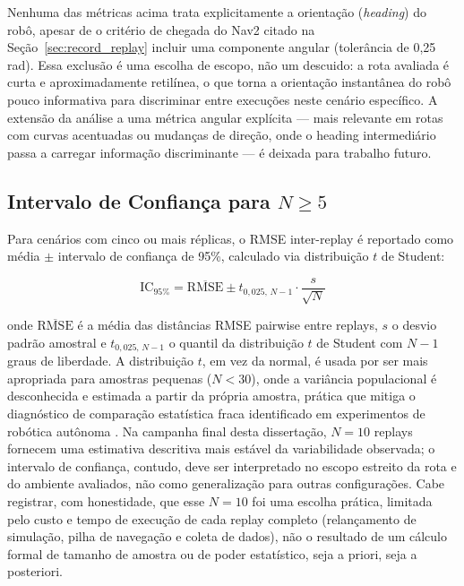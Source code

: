 Nenhuma das métricas acima trata explicitamente a orientação (\textit{heading})
do robô, apesar de o critério de chegada do Nav2 citado na
Seção~\ref{sec:record_replay} incluir uma componente angular (tolerância de
0,25\,rad). Essa exclusão é uma escolha de escopo, não um descuido: a rota
avaliada é curta e aproximadamente retilínea, o que torna a orientação
instantânea do robô pouco informativa para discriminar entre execuções neste
cenário específico. A extensão da análise a uma métrica angular explícita ---
mais relevante em rotas com curvas acentuadas ou mudanças de direção, onde o
heading intermediário passa a carregar informação discriminante --- é deixada
para trabalho futuro.

\subsection{Intervalo de Confiança para $N \geq 5$}
\label{sec:ic_estatistico}

Para cenários com cinco ou mais réplicas, o RMSE inter-replay é reportado como
média $\pm$ intervalo de confiança de 95\%, calculado via distribuição $t$ de
Student:

\begin{equation}
\text{IC}_{95\%} = \overline{\text{RMSE}} \pm t_{0{,}025,\, N-1} \cdot \frac{s}{\sqrt{N}}
\label{eq:ic_95}
\end{equation}

\noindent onde $\overline{\text{RMSE}}$ é a média das distâncias RMSE pairwise entre
replays, $s$ o desvio padrão amostral e $t_{0{,}025,\,N-1}$ o quantil da
distribuição $t$ de Student com $N-1$ graus de liberdade. A distribuição $t$,
em vez da normal, é usada por ser mais apropriada para amostras pequenas
($N < 30$), onde a variância populacional é desconhecida e estimada a partir
da própria amostra, prática que mitiga o diagnóstico de comparação
estatística fraca identificado em experimentos de robótica autônoma
\cite{amigoni2014}. Na campanha final desta dissertação, $N=10$ replays
fornecem uma estimativa descritiva mais estável da variabilidade observada; o
intervalo de confiança, contudo, deve ser interpretado no escopo estreito da
rota e do ambiente avaliados, não como generalização para outras configurações.
Cabe registrar, com honestidade, que esse $N=10$ foi uma escolha prática,
limitada pelo custo e tempo de execução de cada replay completo (relançamento
de simulação, pilha de navegação e coleta de dados), não o resultado de um
cálculo formal de tamanho de amostra ou de poder estatístico, seja a priori,
seja a posteriori.


